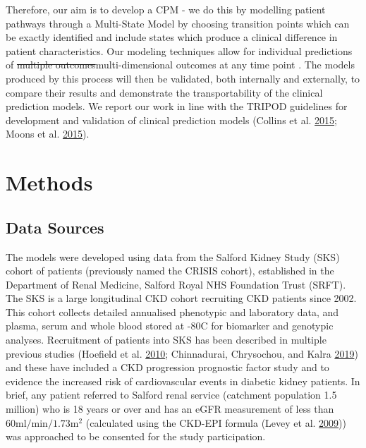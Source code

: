 \documentclass[
]{article}
\begin{document}
Therefore, our aim is to develop a CPM - we do this by modelling patient pathways through a Multi-State Model by choosing transition points which can be exactly identified and include states which produce a clinical difference in patient characteristics. Our modeling techniques allow for individual predictions of \sout{multiple outcomes}multi-dimensional outcomes at any time point . The models produced by this process will then be validated, both internally and externally, to compare their results and demonstrate the transportability of the clinical prediction models. We report our work in line with the TRIPOD guidelines for development and validation of clinical prediction models (Collins et al. \protect\hyperlink{ref-collins_transparent_2015}{2015}; Moons et al. \protect\hyperlink{ref-moons_transparent_2015}{2015}).

\hypertarget{methods-1}{%
\section{Methods}\label{methods-1}}

\hypertarget{data-sources}{%
\subsection{Data Sources}\label{data-sources}}

The models were developed using data from the Salford Kidney Study (SKS) cohort of patients (previously named the CRISIS cohort), established in the Department of Renal Medicine, Salford Royal NHS Foundation Trust (SRFT). The SKS is a large longitudinal CKD cohort recruiting CKD patients since 2002. This cohort collects detailed annualised phenotypic and laboratory data, and plasma, serum and whole blood stored at -80\textdegree C for biomarker and genotypic analyses. Recruitment of patients into SKS has been described in multiple previous studies (Hoefield et al. \protect\hyperlink{ref-hoefield_factors_2010}{2010}; Chinnadurai, Chrysochou, and Kalra \protect\hyperlink{ref-chinnadurai_increased_2019-1}{2019}) and these have included a CKD progression prognostic factor study and to evidence the increased risk of cardiovascular events in diabetic kidney patients. In brief, any patient referred to Salford renal service (catchment population 1.5 million) who is 18 years or over and has an eGFR measurement of less than \(60\textrm{ml}/\textrm{min}/1.73\textrm{m}^2\) (calculated using the CKD-EPI formula (Levey et al. \protect\hyperlink{ref-levey_new_2009}{2009})) was approached to be consented for the study participation.
\end{document}
